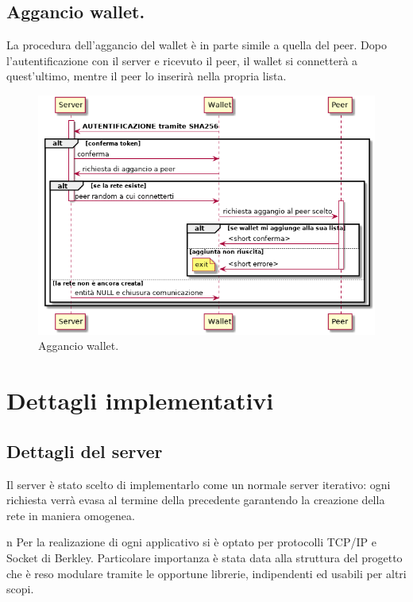 \documentclass[a4paper,10pt]{report}
\begin{document}
  \section{Aggancio wallet.}
  La procedura dell'aggancio del wallet è in parte simile a quella del peer. Dopo l'autentificazione con il server e ricevuto il peer, il wallet si connetterà a quest'ultimo, mentre il peer lo inserirà nella propria lista.
  \begin{figure}[H]
  \center\includegraphics[scale=0.40]{hookwallet.png}
  \caption{Aggancio wallet.}
  \end{figure}
  
  
  \chapter{Dettagli implementativi}
    

    \section{Dettagli del server}\noindent
Il server è stato scelto di implementarlo come un normale server iterativo: ogni richiesta verrà evasa al termine della precedente garantendo la creazione della rete in maniera omogenea.


 
n Per la realizazione di ogni applicativo si è optato per protocolli TCP/IP e Socket di Berkley. Particolare importanza è stata data alla struttura del progetto che è reso modulare tramite le opportune librerie, indipendenti ed usabili per altri scopi.
\end{document}
